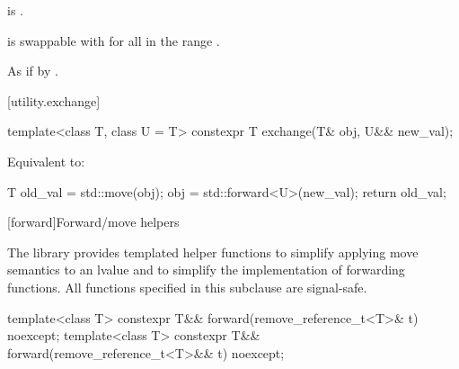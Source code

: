 \begin{itemdescr}
\pnum
\constraints
{} is .

\pnum
\expects
{} is swappable with 
for all  in the range .

\pnum
\effects
As if by .
\end{itemdescr}

[utility.exchange]{}

%
\begin{itemdecl}
template<class T, class U = T>
  constexpr T exchange(T& obj, U&& new_val);
\end{itemdecl}

\begin{itemdescr}
\pnum
\effects
Equivalent to:
\begin{codeblock}
T old_val = std::move(obj);
obj = std::forward<U>(new_val);
return old_val;
\end{codeblock}
\end{itemdescr}


[forward]{Forward/move helpers}

\pnum
The library provides templated helper functions to simplify
applying move semantics to an lvalue and to simplify the implementation
of forwarding functions.
%
%
%
All functions specified in this subclause are signal-safe.

%
%
\begin{itemdecl}
template<class T> constexpr T&& forward(remove_reference_t<T>& t) noexcept;
template<class T> constexpr T&& forward(remove_reference_t<T>&& t) noexcept;
\end{itemdecl}

